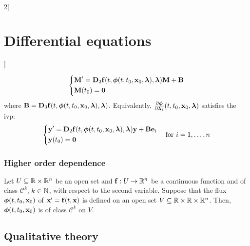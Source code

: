 \documentclass[../../../main.tex]{subfiles}
\begin{document}
\begin{multicols}{2}[\section{Differential equations}]
\begin{theorem}
    \begin{equation*}
      \left\{
      \begin{aligned}
         & \boldsymbol{\mathrm{M}}'      =\boldsymbol{\mathrm{D}}_2\boldsymbol{\mathrm{f}}(t,\boldsymbol{\mathrm{\phi}}(t,t_0,\boldsymbol{\mathrm{x}}_0,\boldsymbol{\mathrm{\lambda}}),\boldsymbol{\mathrm{\lambda}})\boldsymbol{\mathrm{M}}+ \boldsymbol{\mathrm{B}} \\
         & \boldsymbol{\mathrm{M}}(t_0)  =\boldsymbol{\mathrm{0}}
      \end{aligned}
      \right.
    \end{equation*}
    where $\boldsymbol{\mathrm{B}}=\boldsymbol{\mathrm{D}}_3\boldsymbol{\mathrm{f}}(t,\boldsymbol{\mathrm{\phi}}(t,t_0,\boldsymbol{\mathrm{x}}_0,\boldsymbol{\mathrm{\lambda}}),\boldsymbol{\mathrm{\lambda}})$. Equivalently, $\frac{\partial\boldsymbol{\mathrm{\phi}}}{\partial \boldsymbol{\mathrm{\lambda}}_i}(t,t_0,\boldsymbol{\mathrm{x}}_0,\boldsymbol{\mathrm{\lambda}})$ satisfies the ivp:
    $$
      \left\{
      \begin{aligned}
         & \boldsymbol{\mathrm{y}}'      =\boldsymbol{\mathrm{D}}_2\boldsymbol{\mathrm{f}}(t,\boldsymbol{\mathrm{\phi}}(t,t_0,\boldsymbol{\mathrm{x}}_0,\boldsymbol{\mathrm{\lambda}}),\boldsymbol{\mathrm{\lambda}})\boldsymbol{\mathrm{y}}+\boldsymbol{\mathrm{B}}\boldsymbol{\mathrm{e}}_i \\
         & \boldsymbol{\mathrm{y}}(t_0)  =\boldsymbol{\mathrm{0}}
      \end{aligned}
      \right.\quad\text{for }i=1,\ldots,n
    $$
  \end{theorem}
  \subsubsection{Higher order dependence}
  \begin{theorem}
    Let $U\subseteq\mathbb{R}\times\mathbb{R}^n$ be an open set and $\boldsymbol{\mathrm{f}}:U\rightarrow\mathbb{R}^n$ be a continuous function and of class $\mathcal{C}^k$, $k\in\mathbb{N}$, with respect to the second variable. Suppose that the flux $\boldsymbol{\mathrm{\phi}}(t,t_0,\boldsymbol{\mathrm{x}}_0)$ of $\boldsymbol{\mathrm{x}}'=\boldsymbol{\mathrm{f}}(t,\boldsymbol{\mathrm{x}})$ is defined on an open set $V\subseteq\mathbb{R}\times\mathbb{R}\times\mathbb{R}^n$. Then, $\boldsymbol{\mathrm{\phi}}(t,t_0,\boldsymbol{\mathrm{x}}_0)$ is of class $\mathcal{C}^k$ on $V$.
  \end{theorem}
  \subsection{Qualitative theory}

\end{multicols}
\end{document}
